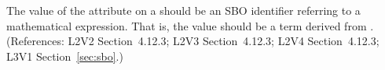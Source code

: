 The value of the  attribute on a \Constraint should be an SBO
identifier referring to a mathematical expression.  That is, the value should
be a term derived from \sbomathformula.  (References: L2V2 Section~4.12.3;
L2V3 Section~4.12.3; L2V4 Section~4.12.3; L3V1 Section~\ref{sec:sbo}.)
